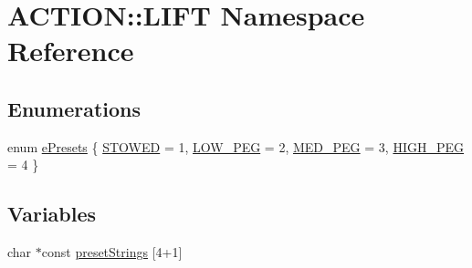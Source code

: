 \hypertarget{namespace_a_c_t_i_o_n_1_1_l_i_f_t}{
\section{\-A\-C\-T\-I\-O\-N\-:\-:\-L\-I\-F\-T \-Namespace \-Reference}
\label{namespace_a_c_t_i_o_n_1_1_l_i_f_t}
}
\subsection*{\-Enumerations}
\begin{DoxyCompactItemize}
\item 
enum \hyperlink{namespace_a_c_t_i_o_n_1_1_l_i_f_t_ab401968ece6d0bdc0105b36c22a9d197}{e\-Presets} \{ \hyperlink{namespace_a_c_t_i_o_n_1_1_l_i_f_t_ab401968ece6d0bdc0105b36c22a9d197afcd1cb376003167c1b4df4c0826751bb}{\-S\-T\-O\-W\-E\-D} =  1, 
\hyperlink{namespace_a_c_t_i_o_n_1_1_l_i_f_t_ab401968ece6d0bdc0105b36c22a9d197a62026ebf7723a78f604c1c6d65686333}{\-L\-O\-W\-\_\-\-P\-E\-G} =  2, 
\hyperlink{namespace_a_c_t_i_o_n_1_1_l_i_f_t_ab401968ece6d0bdc0105b36c22a9d197a6d76c8d14dd3f911859686614e813d29}{\-M\-E\-D\-\_\-\-P\-E\-G} =  3, 
\hyperlink{namespace_a_c_t_i_o_n_1_1_l_i_f_t_ab401968ece6d0bdc0105b36c22a9d197af6672c361e519a3f9b0138c9c3cce8b5}{\-H\-I\-G\-H\-\_\-\-P\-E\-G} =  4
 \}
\end{DoxyCompactItemize}
\subsection*{\-Variables}
\begin{DoxyCompactItemize}
\item 
char $\ast$const \hyperlink{namespace_a_c_t_i_o_n_1_1_l_i_f_t_a4632e771047b73314a8a53d164470cd3}{preset\-Strings} \mbox{[}4+1\mbox{]}
\end{DoxyCompactItemize}



